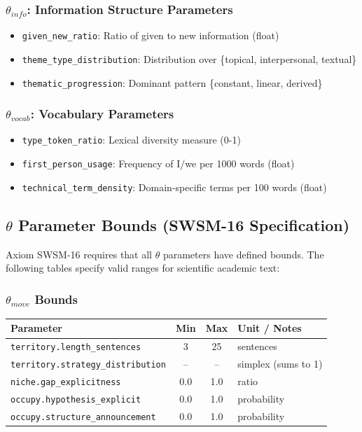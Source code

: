 \subsubsection{$\theta_{info}$: Information Structure Parameters}

\begin{itemize}
    \item \texttt{given\_new\_ratio}: Ratio of given to new information (float)
    \item \texttt{theme\_type\_distribution}: Distribution over \{topical, interpersonal, textual\}
    \item \texttt{thematic\_progression}: Dominant pattern \{constant, linear, derived\}
\end{itemize}

\subsubsection{$\theta_{vocab}$: Vocabulary Parameters}

\begin{itemize}
    \item \texttt{type\_token\_ratio}: Lexical diversity measure (0-1)
    \item \texttt{first\_person\_usage}: Frequency of I/we per 1000 words (float)
    \item \texttt{technical\_term\_density}: Domain-specific terms per 100 words (float)
\end{itemize}

\subsection{$\theta$ Parameter Bounds (SWSM-16 Specification)}
\label{sec:sw-theta-bounds}

Axiom SWSM-16 requires that all $\theta$ parameters have defined bounds. The following tables specify valid ranges for scientific academic text:

\subsubsection{$\theta_{move}$ Bounds}

\begin{center}
\begin{tabular}{lccl}
\toprule
Parameter & Min & Max & Unit / Notes \\
\midrule
\texttt{territory.length\_sentences} & 3 & 25 & sentences \\
\texttt{territory.strategy\_distribution} & -- & -- & simplex (sums to 1) \\
\texttt{niche.gap\_explicitness} & 0.0 & 1.0 & ratio \\
\texttt{occupy.hypothesis\_explicit} & 0.0 & 1.0 & probability \\
\texttt{occupy.structure\_announcement} & 0.0 & 1.0 & probability \\
\bottomrule
\end{tabular}
\end{center}

